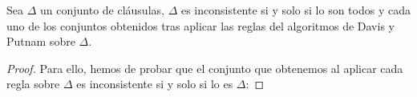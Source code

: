  \begin{teo}\label{teo:func_davis_putnam}
     Sea $\Delta$ un conjunto de cláusulas, $\Delta$ es inconsistente si y solo si lo son todos y cada uno de los conjuntos obtenidos tras aplicar las reglas del algoritmos de Davis y Putnam sobre $\Delta$.
     \begin{proof}
         Para ello, hemos de probar que el conjunto que obtenemos al aplicar cada regla sobre $\Delta$ es inconsistente si y solo si lo es $\Delta$:

\end{proof}
\end{teo}
